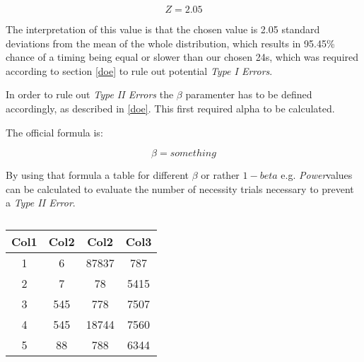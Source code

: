             \begin{equation}\label{z-result}
                Z = 2.05
            \end{equation}

            The interpretation of this value is that the chosen value is 2.05 standard deviations from the mean of the whole distribution, which results in 95.45\% chance of a timing being equal or slower than our chosen 24s, which was required according to section \ref*{doe} to rule out potential \textit{Type I Errors}.

            \medskip

            In order to rule out \textit{Type II Errors} the $\beta$ paramenter has to be defined accordingly, as described in \ref*{doe}. This first required alpha to be calculated. 

            The official formula is:

            \begin{equation}\label{beta-value}
                \beta = something
            \end{equation}


            \medskip

            By using that formula a table for different $\beta$ or rather $1-beta$ e.g. \textit{Power}values can be calculated to evaluate the number of necessity trials necessary to prevent a \textit{Type II Error}.

            \begin{table}[h!]
                \centering
                \begin{tabular}{||c c c c||} 
                 \hline
                 Col1 & Col2 & Col2 & Col3 \\ [0.5ex] 
                 \hline\hline
                 1 & 6 & 87837 & 787 \\ 
                 2 & 7 & 78 & 5415 \\
                 3 & 545 & 778 & 7507 \\
                 4 & 545 & 18744 & 7560 \\
                 5 & 88 & 788 & 6344 \\ [1ex] 
                 \hline
                \end{tabular}
                \caption{}
                \label{beta}
            \end{table}

